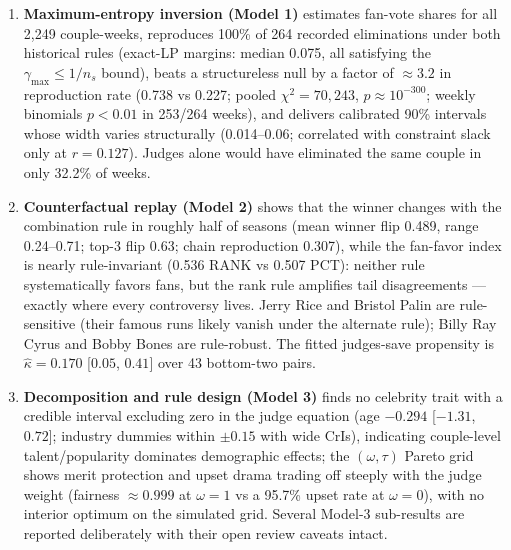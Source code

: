 \documentclass[11pt]{article}
\begin{document}
\begin{enumerate}[itemsep=2pt]
  \item \textbf{Maximum-entropy inversion (Model 1)} estimates fan-vote shares for all
        2{,}249 couple-weeks, reproduces 100\% of 264 recorded eliminations under both
        historical rules (exact-LP margins: median 0.075, all satisfying the
        $\gamma_{\max} \le 1/n_s$ bound), beats a structureless null by a factor of
        $\approx 3.2$ in reproduction rate (0.738 vs 0.227; pooled $\chi^2 = 70{,}243$,
        $p \approx 10^{-300}$; weekly binomials $p<0.01$ in 253/264 weeks), and
        delivers calibrated 90\% intervals whose width varies structurally
        (0.014--0.06; correlated with constraint slack only at $r = 0.127$). Judges
        alone would have eliminated the same couple in only 32.2\% of weeks.
  \item \textbf{Counterfactual replay (Model 2)} shows that the winner changes with the
        combination rule in roughly half of seasons (mean winner flip 0.489, range
        0.24--0.71; top-3 flip 0.63; chain reproduction 0.307), while the fan-favor
        index is nearly rule-invariant (0.536 RANK vs 0.507 PCT): neither rule
        systematically favors fans, but the rank rule amplifies tail disagreements ---
        exactly where every controversy lives. Jerry Rice and Bristol Palin are
        rule-sensitive (their famous runs likely vanish under the alternate rule);
        Billy Ray Cyrus and Bobby Bones are rule-robust. The fitted judges-save
        propensity is $\hat\kappa = 0.170$ [$0.05$, $0.41$] over 43 bottom-two pairs.
  \item \textbf{Decomposition and rule design (Model 3)} finds no celebrity trait with
        a credible interval excluding zero in the judge equation (age $-0.294$
        [$-1.31$, $0.72$]; industry dummies within $\pm 0.15$ with wide CrIs),
        indicating couple-level talent/popularity dominates demographic effects; the
        $(\omega,\tau)$ Pareto grid shows merit protection and upset drama trading off
        steeply with the judge weight (fairness $\approx 0.999$ at $\omega = 1$ vs a
        95.7\% upset rate at $\omega = 0$), with no interior optimum on the simulated
        grid. Several Model-3 sub-results are reported deliberately with their open
        review caveats intact.
\end{enumerate}
\end{document}
